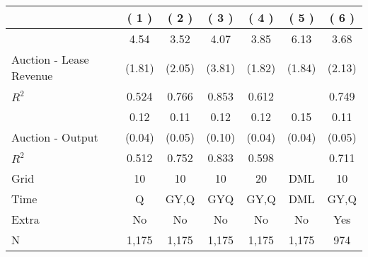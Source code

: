 
\begin{tabular}{lcccccc}
\toprule
  & ( 1 ) & ( 2 ) & ( 3 ) & ( 4 ) & ( 5 ) & ( 6 )\\
\midrule
 & 4.54 & 3.52 & 4.07 & 3.85 & 6.13 & 3.68\\

\multirow{-2}{*}{\raggedright\arraybackslash Auction - Lease Revenue} & (1.81) & (2.05) & (3.81) & (1.82) & (1.84) & (2.13)\\

$R^2$ & 0.524 & 0.766 & 0.853 & 0.612 &  & 0.749\\

\midrule
 & 0.12 & 0.11 & 0.12 & 0.12 & 0.15 & 0.11\\

\multirow{-2}{*}{\raggedright\arraybackslash Auction - Output} & (0.04) & (0.05) & (0.10) & (0.04) & (0.04) & (0.05)\\

$R^2$ & 0.512 & 0.752 & 0.833 & 0.598 &  & 0.711\\

\midrule
Grid & 10 & 10 & 10 & 20 & DML & 10\\

Time & Q & GY,Q & GYQ & GY,Q & DML & GY,Q\\

Extra & No & No & No & No & No & Yes\\

N & 1,175 & 1,175 & 1,175 & 1,175 & 1,175 & 974\\
\bottomrule
\end{tabular}
